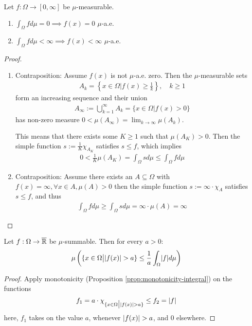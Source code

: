 \begin{prop}
  Let $f: \Omega \to [0,\infty]$ be $\mu$-measurable.
  \begin{enumerate}
    \item $\int_{\Omega} f d \mu = 0 \implies f(x) = 0$ $\mu$-a.e.
    \item $\int_{\Omega} f d \mu < \infty \implies f(x) < \infty$ $\mu$-a.e.
  \end{enumerate}
\end{prop}
\begin{proof}
\begin{enumerate}
  \item Contraposition: Assume $f(x)$ is not $\mu$-a.e. zero. Then the $\mu$-measurable sets
    \begin{align*}
      A_k = \left\{x \in \Omega \big\vert f(x) \geq \frac{1}{k}\right\}, \quad k \geq 1
    \end{align*}
    form an increasing sequence and their union
    \begin{align*}
      A_{\infty} := \bigcup_{k=1}^{\infty} A_k = \{x \in \Omega \big\vert f(x) > 0\}
    \end{align*}
    has non-zero measure $0 < \mu(A_{\infty}) = \lim_{k \to \infty} \mu(A_k)$.

    This means that there exists some $K \geq 1$ such that $\mu(A_K) > 0$.
    Then the simple function 
    $s := \frac{1}{K} \chi_{A_K}$
    satisfies $s \leq f$, which implies
    \begin{align*}
      0 < \frac{1}{K} \mu(A_K) = \int_{\Omega} s d \mu \leq \int_{\Omega} f d \mu
    \end{align*}
  \item Contraposition: Assume there exists an $A \subseteq \Omega$ with
    $f(x) = \infty, \forall x \in A, \mu(A) > 0$
    then the simple function
    $s := \infty \cdot \chi_{A}$ satisfies $s \leq f$, and thus
    \begin{align*}
      \int_{\Omega} f d \mu \geq \int_{\Omega} s d \mu = \infty \cdot \mu(A) = \infty
    \end{align*}
\end{enumerate}
\end{proof}


\begin{thm}\label{thm:tchebychev-inequality}
  Let $f: \Omega \to \overline{\mathbb{R}}$ be $\mu$-summable. Then for every $a > 0$:
  \begin{align*}
    \mu\left(
      \{x \in \Omega \big\vert \abs{f(x)} > a\}
      \leq \frac{1}{a} \int_{\Omega} \abs{f} d \mu
    \right)
  \end{align*}
\end{thm}
\begin{proof}
  Apply monotonicity (Proposition \ref{prop:monotonicity-integral}) on the functions
  \begin{align*}
      f_1 = a \cdot \chi_{\{x \in \Omega \big\vert \vert f(x)\vert > a\}} \leq f_2 = \vert f\vert
  \end{align*}
  here, $f_1$ takes on the value $a$, whenever $\vert f(x)\vert > a$, and $0$ elsewhere.
\end{proof}
